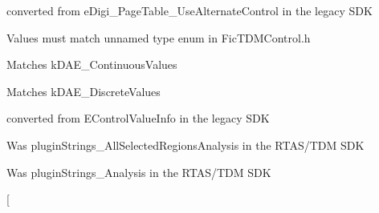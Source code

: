 \begin{DoxyRefList}
\item[\label{a00385__porting_notes000026}%
\hypertarget{a00385__porting_notes000026}{}%
global\+Scope$>$ Member \hyperlink{a00206_aa169208a2ce713fa021e20deb2eaf608a1a0d975a333d3aee81b22f878697e9c4}{A\+A\+X\+\_\+e\+Page\+Table\+\_\+\+Use\+Alternate\+Control} ]converted from {\ttfamily e\+Digi\+\_\+\+Page\+Table\+\_\+\+Use\+Alternate\+Control} in the legacy S\+D\+K 
\item[\label{a00385__porting_notes000010}%
\hypertarget{a00385__porting_notes000010}{}%
global\+Scope$>$ Member \hyperlink{a00206_a193b89c4e2c5b57f2c4d7d5b5782fe87}{A\+A\+X\+\_\+\+E\+Parameter\+Type} ]Values must match unnamed type enum in Fic\+T\+D\+M\+Control.\+h 
\item[\label{a00385__porting_notes000023}%
\hypertarget{a00385__porting_notes000023}{}%
global\+Scope$>$ Member \hyperlink{a00206_a4cd0f189daa9a60cf36883c56344bb2eade82e7d1b5012a76837b70c1a9b92168}{A\+A\+X\+\_\+e\+Parameter\+Type\+\_\+\+Continuous} ]Matches {\ttfamily k\+D\+A\+E\+\_\+\+Continuous\+Values}  
\item[\label{a00385__porting_notes000022}%
\hypertarget{a00385__porting_notes000022}{}%
global\+Scope$>$ Member \hyperlink{a00206_a4cd0f189daa9a60cf36883c56344bb2ea2a3c9939ef1fa8b8f729152c35c42740}{A\+A\+X\+\_\+e\+Parameter\+Type\+\_\+\+Discrete} ]Matches {\ttfamily k\+D\+A\+E\+\_\+\+Discrete\+Values}  
\item[\label{a00385__porting_notes000011}%
\hypertarget{a00385__porting_notes000011}{}%
global\+Scope$>$ Member \hyperlink{a00206_aa169208a2ce713fa021e20deb2eaf608}{A\+A\+X\+\_\+\+E\+Parameter\+Value\+Info\+Selector} ]converted from {\ttfamily E\+Control\+Value\+Info} in the legacy S\+D\+K  
\item[\label{a00385__porting_notes000016}%
\hypertarget{a00385__porting_notes000016}{}%
global\+Scope$>$ Member \hyperlink{a00206_a86f7310877399d9d4d2ea4863d472476a18ce96adcc5420f19c7247bde5718490}{A\+A\+X\+\_\+e\+Plug\+In\+Strings\+\_\+\+All\+Selected\+Regions\+Analysis} ]Was plugin\+Strings\+\_\+\+All\+Selected\+Regions\+Analysis in the R\+T\+A\+S/\+T\+D\+M S\+D\+K  
\item[\label{a00385__porting_notes000012}%
\hypertarget{a00385__porting_notes000012}{}%
global\+Scope$>$ Member \hyperlink{a00206_a86f7310877399d9d4d2ea4863d472476a452cb68d82f40ff3464752eed92543ed}{A\+A\+X\+\_\+e\+Plug\+In\+Strings\+\_\+\+Analysis} ]Was plugin\+Strings\+\_\+\+Analysis in the R\+T\+A\+S/\+T\+D\+M S\+D\+K  
\item[\label{a00385__porting_notes000020}%

\end{DoxyRefList}
